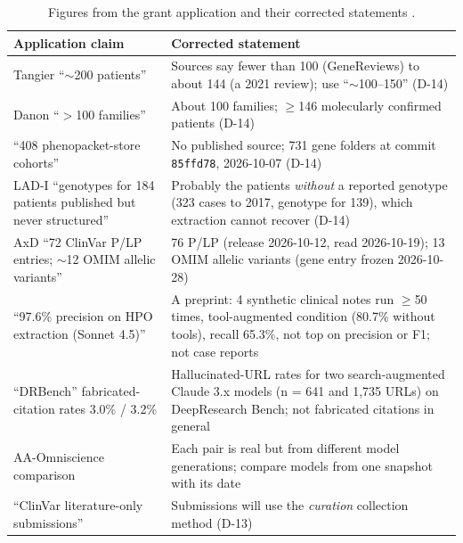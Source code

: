 \documentclass{article} %
\begin{document}
\begin{table}[!htbp]
\caption{Figures from the grant application and their corrected statements \citep{koseki2021_tangier_review,genereviews_tangier,sugie2024_danon_history,larsen2026_hpo_mcp,rao2026_reference_hallucination,jackson2025_aa_omniscience}.}
\begin{center}
\scriptsize
\begin{tabular}{L{4.3cm}L{8.6cm}}
\toprule
Application claim & Corrected statement \\
\midrule
Tangier ``$\sim$200 patients'' & Sources say fewer than 100 (GeneReviews) to about 144 (a 2021 review); use ``$\sim$100--150'' (D-14) \\
Danon ``$>$100 families'' & About 100 families; $\geq$146 molecularly confirmed patients (D-14) \\
``408 phenopacket-store cohorts'' & No published source; 731 gene folders at commit \texttt{85ffd78}, 2026-10-07 (D-14) \\
LAD-I ``genotypes for 184 patients published but never structured'' & Probably the patients \emph{without} a reported genotype (323 cases to 2017, genotype for 139), which extraction cannot recover (D-14) \\
AxD ``72 ClinVar P/LP entries; $\sim$12 OMIM allelic variants'' & 76 P/LP (release 2026-10-12, read 2026-10-19); 13 OMIM allelic variants (gene entry frozen 2026-10-28) \\
``97.6\% precision on HPO extraction (Sonnet 4.5)'' & A preprint: 4 synthetic clinical notes run $\geq$50 times, tool-augmented condition (80.7\% without tools), recall 65.3\%, not top on precision or F1; not case reports \\
``DRBench'' fabricated-citation rates 3.0\% / 3.2\% & Hallucinated-URL rates for two search-augmented Claude 3.x models (n = 641 and 1,735 URLs) on DeepResearch Bench; not fabricated citations in general \\
AA-Omniscience comparison & Each pair is real but from different model generations; compare models from one snapshot with its date \\
``ClinVar literature-only submissions'' & Submissions will use the \emph{curation} collection method (D-13) \\
\bottomrule
\end{tabular}
\end{center}
\end{table}
\FloatBarrier
\end{document}
